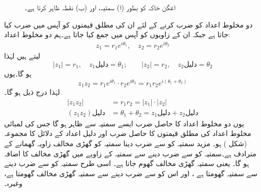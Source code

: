 \begin{figure}
\centering
{}\hfill
{}
\caption{
اغگن خاکہ  کو  بطور (ا)  سمتیہ، اور (ب)    نقطہ ظاہر کرتا ہے۔
}
\label{شکل_ضمیمہ_تین_چار}
\end{figure}

دو مخلوط اعداد کو ضرب کرنے کے لئے ان کی مطلق قیمتوں کو آپس   میں ضرب کیا جاتا ہے جبکہ ان کے زاویوں کو  آپس میں جمع کیا جاتا  ہے۔ہم    دو مخلوط اعداد:
\begin{align}\label{مساوات_ضمیمہ_مخلوط_دو_اعداد}
z_1=r_1e^{i\theta_1},\quad   z_2=r_2e^{i\theta_2}
\end{align}
لیتے ہیں لہٰذا 
\[|z_1|=r_1,\quad z_1 \text{دلیل}=\theta_1;\quad\quad  |z_2|=r_2,\quad z_2 \text{دلیل}=\theta_2\]
ہو گا۔یوں    
\[z_1z_2=r_1e^{i\theta_1}\cdot r_2e^{i\theta_2}=r_1r_2e^{i(\theta_1+\theta_2)}\]
لہٰذا درج ذیل ہو گا۔
\begin{equation}
\begin{aligned}\label{مساوات_ضمیمہ_مخلوط_دلیل}
|z_1z_2|&=r_1r_2=|z_1|\cdot |z_2|\\
(z_1z_2)\text{دلیل}&=\theta_1+\theta_2=z_1 \text{دلیل}+z_2\text{دلیل}
\end{aligned}
\end{equation}
یوں دو مخلوط اعداد کا حاصل ضرب  ایسے سمتیہ سے ظاہر  ہو گا جس کی لمبائی   مخلوط اعداد کی مطلق قیمتوں  کا حاصل ضرب  اور  دلیل اعداد کے دلائل کا مجموعہ  (شکل ) ہو۔ مزید سمتیہ کو  سے ضرب دینا سمتیہ  کو  گھڑی  مخالف  زاویہ  گھمانے کے مترادف ہے۔سمتیہ کو  سے ضرب دینے سے سمتیہ کے زاویے میں  گھڑی مخالف     کا اضافہ ہو گا۔ یعنی سمتیہ  گھڑی   مخالف    گھوم جاتا ہے۔ اسی طرح سمتیہ کو   سے ضرب  دینے سے سمتیہ  گھومتا ہے ،  اور  اس کو  سے ضرب دینے سے سمتیہ      گھڑی  مخالف گھومتا ہے، وغیرہ۔

